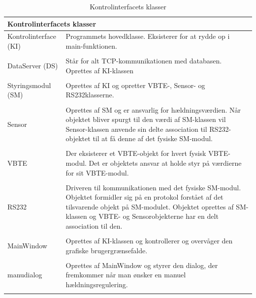 \begin{table}[H]
\centering
\begin{tabular}{p{3cm} p{12.5cm}}
\multicolumn{2}{l}{{\Large Kontrolinterfacets klasser}} \\\hline
Kontrolinterface (KI)&Programmets hovedklasse. Eksisterer for at rydde op i main-funktionen.\\\\
DataServer (DS)&Står for alt TCP-kommunikationen med databasen. Oprettes af KI-klassen\\\\
Styringsmodul (SM)&Oprettes af KI og opretter VBTE-, Sensor- og RS232klasserne.\\\\
Sensor&Oprettes af SM og er ansvarlig for hældningsværdien. Når objektet bliver spurgt til den værdi af SM-klassen vil Sensor-klassen anvende sin delte association til RS232-objektet til at få denne af det fysiske SM-modul.\\\\
VBTE&Der eksisterer et VBTE-objekt for hvert fysisk VBTE-modul. Det er objektets ansvar at holde styr på værdierne for sit VBTE-modul.\\\\
RS232&Driveren til kommunikationen med det fysiske SM-modul. Objektet formidler sig på en protokol forstået af det tilsvarende objekt på SM-modulet. Objektet oprettes af SM-klassen og VBTE- og Sensorobjekterne har en delt association til den.\\\\
MainWindow&Oprettes af KI-klassen og kontrollerer og overvåger den grafiske brugergrænsefalde.\\\\
manudialog&Oprettes af MainWindow og styrer den dialog, der fremkommer når man ønsker en manuel hældningsregulering.\\\\
\end{tabular}
\caption{Kontrolinterfacets klasser}
\label{tabel:ki-klasser}
\end{table}